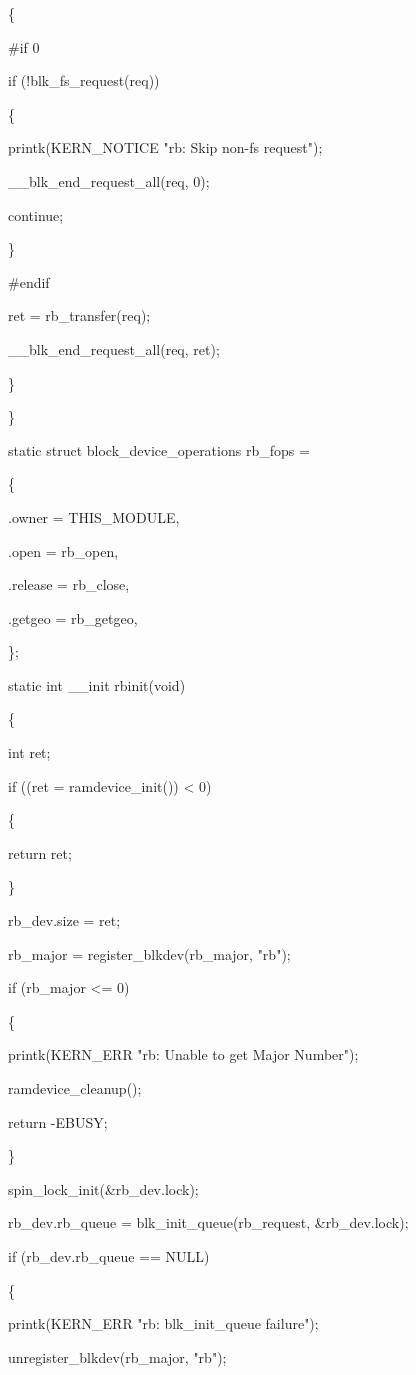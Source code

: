 \documentclass[11pt]{article}
\begin{document}
	\{
	
\#if 0
		
		if (!blk\_fs\_request(req))
		
		\{
		
			printk(KERN\_NOTICE "rb: Skip non-fs request\n");
			
			\_\_blk\_end\_request\_all(req, 0);
			
			continue;
			
		\}
		
\#endif

		ret = rb\_transfer(req);
		
		\_\_blk\_end\_request\_all(req, ret);
		
	\}
	
\}


static struct block\_device\_operations rb\_fops =

\{
	
	.owner = THIS\_MODULE,
	
	.open = rb\_open,
	
	.release = rb\_close,
	
	.getgeo = rb\_getgeo,
	
\};
	

static int \_\_init rbinit(void)

\{

	int ret;

	if ((ret = ramdevice\_init()) < 0)
	
	\{
	
		return ret;
		
	\}
	
	rb\_dev.size = ret;

	rb\_major = register\_blkdev(rb\_major, "rb");
	
	if (rb\_major <= 0)
	
	\{
	
		printk(KERN\_ERR "rb: Unable to get Major Number\n");
		
		ramdevice\_cleanup();
		
		return -EBUSY;
		
	\}

	spin\_lock\_init(&rb\_dev.lock);
	
	rb\_dev.rb\_queue = blk\_init\_queue(rb\_request, &rb\_dev.lock);
	
	if (rb\_dev.rb\_queue == NULL)
	
	\{
	
		printk(KERN\_ERR "rb: blk\_init\_queue failure\n");
		
		unregister\_blkdev(rb\_major, "rb");
		
\end{document}
